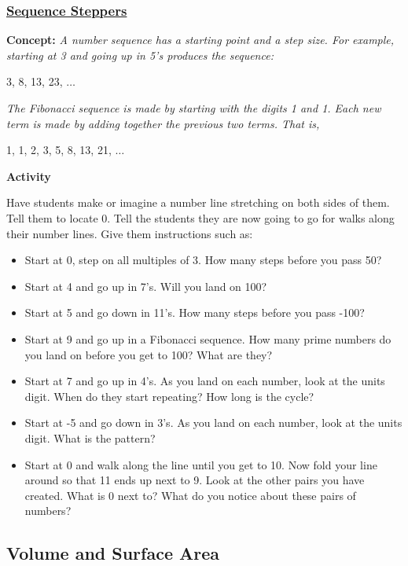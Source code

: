 		\subsubsection{\underline{Sequence Steppers}}
		\textbf{Concept:} \emph{A number sequence has a starting point and a step size. For example, starting at 3 and going up in 5's produces the sequence:}
		\begin{center}
		3, 8, 13, 23, $\ldots$
\end{center}

\noindent \emph{The Fibonacci sequence is made by starting with the digits 1 and 1. Each new term is made by adding together the previous two terms. That is,}
\begin{center}
1, 1, 2, 3, 5, 8, 13, 21, $\ldots$
\end{center}	

\noindent \textbf{Activity}

\noindent Have students make or imagine a number line stretching on both sides of them. Tell them to locate 0. Tell the students they are now going to go for walks along their number lines. Give them instructions such as:
\begin{itemize}
\item Start at 0, step on all multiples of 3. How many steps before you pass 50?
\item Start at 4 and go up in 7's. Will you land on 100?
\item Start at 5 and go down in 11's. How many steps before you pass -100?
\item Start at 9 and go up in a Fibonacci sequence. How many prime numbers do you land on before you get to 100? What are they?
\item Start at 7 and go up in 4's. As you land on each number, look at the units digit. When do they start repeating? How long is the cycle?
\item Start at -5 and go down in 3's. As you land on each number, look at the units digit. What is the pattern?
\item Start at 0 and walk along the line until you get to 10. Now fold your line around so that 11 ends up next to 9. Look at the other pairs you have created. What is 0 next to? What do you notice about these pairs of numbers?
\end{itemize}		
	
	\subsection{Volume and Surface Area} \label{classacts3d}
	

